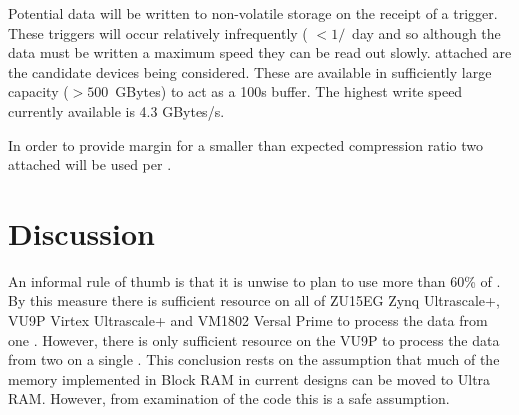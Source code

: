 \documentclass{article}
\begin{document}
Potential  data will be written to non-volatile storage on the receipt of a  trigger. These triggers will occur relatively infrequently ( $< 1/$~day and so although the data must be written a maximum speed they can be read out slowly.  attached  are the candidate devices being considered. These  are available in sufficiently large capacity ($> 500$~GBytes) to act as a 100s buffer. The highest write speed currently available is 4.3 GBytes/s\cite{ref:AORUS-NVMe-Gen4-SSD-1TB}. 

In order to provide margin for a smaller than expected compression ratio two  attached  will be used per .



\section{Discussion}

An informal rule of thumb is that it is unwise to plan to use more than 60\% of . By this measure there is sufficient resource on all of ZU15EG Zynq Ultrascale+, VU9P Virtex Ultrascale+ and VM1802 Versal Prime to process the data from one . However, there is only sufficient resource on the VU9P to process the data from two  on a single . This conclusion rests on the assumption that much of the memory implemented in Block RAM in current designs can be moved to Ultra RAM. However, from examination of the code this is a safe assumption. 

\newpage
\printglossary
\end{document}
